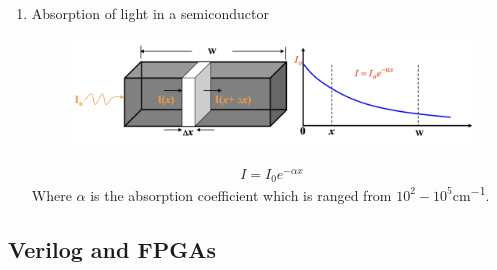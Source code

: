 \documentclass{article}
\begin{document}
\begin{enumerate}
\begin{enumerate}
    \end{enumerate}
    \item Absorption of light in a semiconductor \\
    \begin{figure}[h]
        \centering
        \includegraphics[width=1\linewidth]{image/absorption.png}
    \end{figure}
    \begin{equation}
        I = I_0e^{-\alpha x}
    \end{equation}
    Where $\alpha$ is the absorption coefficient which is ranged from $10^2 - 10^5$\unit{cm^{-1}}.
\end{enumerate}


\newpage
\subsection{Verilog and FPGAs}   %
\end{document}
